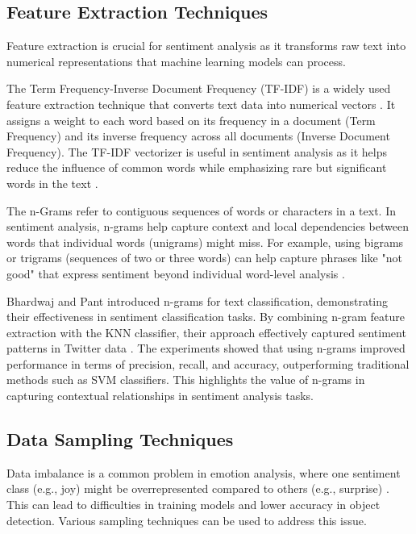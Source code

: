 \subsection{Feature Extraction Techniques}

Feature extraction is crucial for sentiment analysis as it transforms raw text into numerical representations that machine learning models can process.

The Term Frequency-Inverse Document Frequency (TF-IDF) is a widely used feature extraction technique that converts text data into numerical vectors \cite{Semary2024}. It assigns a weight to each word based on its frequency in a document (Term Frequency) and its inverse frequency across all documents (Inverse Document Frequency). The TF-IDF vectorizer is useful in sentiment analysis as it helps reduce the influence of common words while emphasizing rare but significant words in the text \cite{Nguyen2014}.

The n-Grams refer to contiguous sequences of words or characters in a text. In sentiment analysis, n-grams help capture context and local dependencies between words that individual words (unigrams) might miss. For example, using bigrams or trigrams (sequences of two or three words) can help capture phrases like "not good" that express sentiment beyond individual word-level analysis \cite{Ojo2021}.

Bhardwaj and Pant introduced n-grams for text classification, demonstrating their effectiveness in sentiment classification tasks. By combining n-gram feature extraction with the KNN classifier, their approach effectively captured sentiment patterns in Twitter data \cite{Bhardwaj2019}. The experiments showed that using n-grams improved performance in terms of precision, recall, and accuracy, outperforming traditional methods such as SVM classifiers. This highlights the value of n-grams in capturing contextual relationships in sentiment analysis tasks.

\subsection{Data Sampling Techniques}

Data imbalance is a common problem in emotion analysis, where one sentiment class (e.g., joy) might be overrepresented compared to others (e.g., surprise) \cite{Kaur2023}. This can lead to difficulties in training models and lower accuracy in object detection. Various sampling techniques can be used to address this issue.

